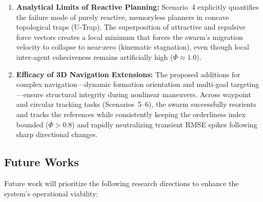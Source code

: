 \documentclass[pdflatex,sn-basic]{sn-jnl}%
\begin{document}
\begin{enumerate}
            \item \textbf{Analytical Limits of Reactive Planning:} Scenario~4 explicitly quantifies the failure mode of purely reactive, memoryless planners in concave topological traps (U-Trap). The superposition of attractive and repulsive force vectors creates a local minimum that forces the swarm's migration velocity to collapse to near-zero (kinematic stagnation), even though local inter-agent cohesiveness remains artificially high ($\overline{\Phi} \approx 1.0$).

            \item \textbf{Efficacy of 3D Navigation Extensions:} The proposed additions for complex navigation---dynamic formation orientation and multi-goal targeting---ensure structural integrity during nonlinear maneuvers. Across waypoint and circular tracking tasks (Scenarios~5--6), the swarm successfully reorients and tracks the references while consistently keeping the orderliness index bounded ($\overline{\Phi} > 0.8$) and rapidly neutralizing transient RMSE spikes following sharp directional changes.

        \end{enumerate}

    \subsection{Future Works}
        Future work will prioritize the following research directions to enhance the system's operational viability:
\end{document}
